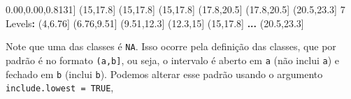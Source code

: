 \documentclass[10pt,a4paper]{book}
\newenvironment{Shaded}{\begin{snugshade}}{\end{snugshade}}
\newcommand{\KeywordTok}[1]{\textcolor[rgb]{0.13,0.29,0.53}{\textbf{#1}}}
\newcommand{\DecValTok}[1]{\textcolor[rgb]{0.00,0.00,0.81}{#1}}
\newcommand{\FloatTok}[1]{\textcolor[rgb]{0.00,0.00,0.81}{#1}}
\newcommand{\StringTok}[1]{\textcolor[rgb]{0.31,0.60,0.02}{#1}}
\newcommand{\OperatorTok}[1]{\textcolor[rgb]{0.81,0.36,0.00}{\textbf{#1}}}
\newcommand{\NormalTok}[1]{#1}
\begin{document}
\begin{Shaded}
\begin{Highlighting}[]
\NormalTok{[}\DecValTok{31}\NormalTok{] (}\DecValTok{15}\NormalTok{,}\FloatTok{17.8}\NormalTok{]   (}\DecValTok{15}\NormalTok{,}\FloatTok{17.8}\NormalTok{]   (}\DecValTok{15}\NormalTok{,}\FloatTok{17.8}\NormalTok{]   (}\FloatTok{17.8}\NormalTok{,}\FloatTok{20.5}\NormalTok{] (}\FloatTok{17.8}\NormalTok{,}\FloatTok{20.5}\NormalTok{] (}\FloatTok{20.5}\NormalTok{,}\FloatTok{23.3}\NormalTok{]}
\DecValTok{7}\NormalTok{ Levels}\OperatorTok{:}\StringTok{ }\NormalTok{(}\DecValTok{4}\NormalTok{,}\FloatTok{6.76}\NormalTok{] (}\FloatTok{6.76}\NormalTok{,}\FloatTok{9.51}\NormalTok{] (}\FloatTok{9.51}\NormalTok{,}\FloatTok{12.3}\NormalTok{] (}\FloatTok{12.3}\NormalTok{,}\DecValTok{15}\NormalTok{] (}\DecValTok{15}\NormalTok{,}\FloatTok{17.8}\NormalTok{] }\KeywordTok{...}\NormalTok{ (}\FloatTok{20.5}\NormalTok{,}\FloatTok{23.3}\NormalTok{]}
\end{Highlighting}
\end{Shaded}

Note que uma das classes é \texttt{NA}. Isso ocorre pela definição das
classes, que por padrão é no formato \texttt{(a,b{]}}, ou seja, o
intervalo é aberto em \texttt{a} (não inclui \texttt{a}) e fechado em
\texttt{b} (inclui \texttt{b}). Podemos alterar esse padrão usando o
argumento \texttt{include.lowest\ =\ TRUE},
\end{document}
